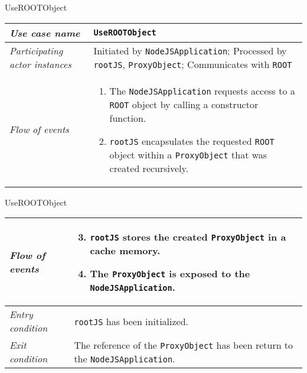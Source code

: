 \begin{frame}{UseROOTObject}
        \begin{longtable}{p{3cm} @{\hskip 1cm} p{7cm}}
                \hline

                \textit{Use case name} & \texttt{UseROOTObject}\\
                \hline

                \textit{Participating actor instances} &
                Initiated by \texttt{NodeJSApplication}; Processed by \texttt{rootJS}, \texttt{ProxyObject}; Communicates with \texttt{ROOT}\\
                \hline

                \textit{Flow of events} &
                        \begin{enumerate}
                                \item The \texttt{NodeJSApplication} requests access to a \texttt{ROOT} object by calling a constructor function.
                                \item \texttt{rootJS} encapsulates the requested \texttt{ROOT} object within a \texttt{ProxyObject} that was created recursively.
                        \end{enumerate}
                        \\
        \end{longtable}
\end{frame}
\begin{frame}[t]{UseROOTObject}
        \begin{longtable}{p{3cm} @{\hskip 1cm} p{7cm}}
                \textit{Flow of events} &
                        \begin{enumerate}
                                \setcounter{enumi}{2}
                                \item \texttt{rootJS} stores the created \texttt{ProxyObject} in a cache memory.
                                \item The \texttt{ProxyObject} is exposed to the \texttt{NodeJSApplication}.
                        \end{enumerate}
                        \\
                \hline

                \textit{Entry condition} & \texttt{rootJS} has been initialized.\\
                \hline

                \textit{Exit condition} & The reference of the \texttt{ProxyObject} has been return to the \texttt{NodeJSApplication}.\\
                \hline
        \end{longtable}
\end{frame}

